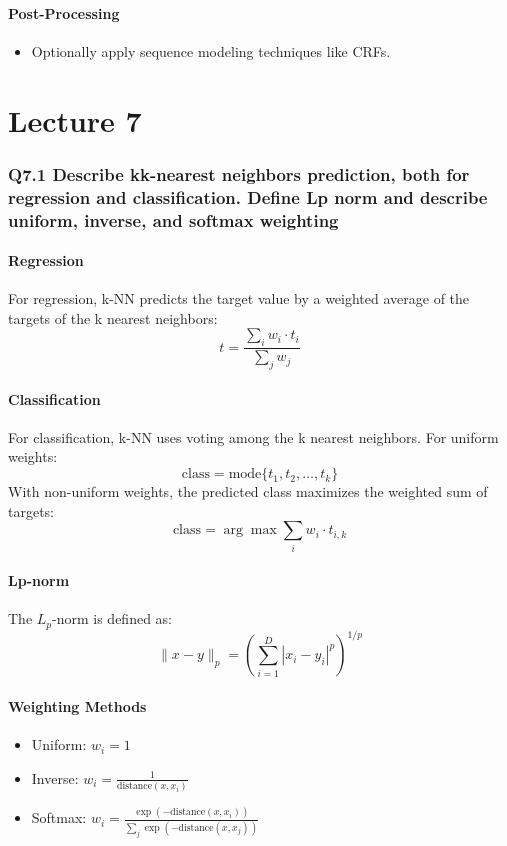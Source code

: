 \documentclass[11pt]{article}
\begin{document}
\subsection*{Post-Processing}
\begin{itemize}
    \item Optionally apply sequence modeling techniques like CRFs.
\end{itemize}

\part{Lecture 7}

\section{Q7.1 Describe kk-nearest neighbors prediction, both for regression and classification. Define Lp norm and describe uniform, inverse, and softmax weighting}

\subsection*{Regression}
For regression, k-NN predicts the target value by a weighted average of the targets of the k nearest neighbors:
\[ t = \frac{\sum_{i} w_i \cdot t_i}{\sum_{j} w_j} \]

\subsection*{Classification}
For classification, k-NN uses voting among the k nearest neighbors. For uniform weights:
\[ \text{class} = \text{mode}\{t_1, t_2, \ldots, t_k\} \]
With non-uniform weights, the predicted class maximizes the weighted sum of targets:
\[ \text{class} = \arg\max \sum_{i} w_i \cdot t_{i,k} \]

\subsection*{Lp-norm}
The \( L_p \)-norm is defined as:
\[ \lVert x - y \rVert_p = \left( \sum_{i=1}^{D} |x_i - y_i|^p \right)^{1/p} \]

\subsection*{Weighting Methods}
\begin{itemize}
    \item Uniform: \( w_i = 1 \)
    \item Inverse: \( w_i = \frac{1}{\text{distance}(x, x_i)} \)
    \item Softmax: \( w_i = \frac{\exp(-\text{distance}(x, x_i))}{\sum_j \exp(-\text{distance}(x, x_j))} \)
\end{itemize}
\end{document}
